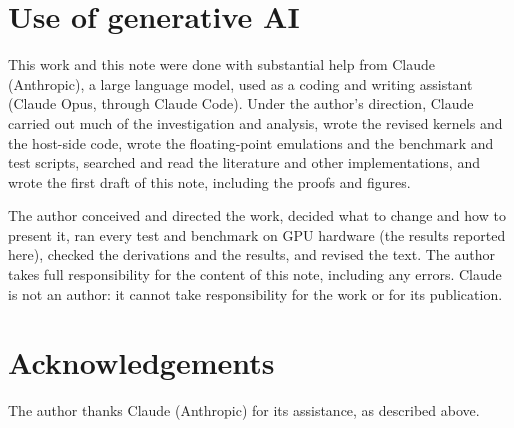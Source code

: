 \documentclass[11pt,a4paper]{article}
\theoremstyle{remark}
\begin{document}
\section*{Use of generative AI}
This work and this note were done with substantial help from Claude (Anthropic), a large language model, used
as a coding and writing assistant (Claude Opus, through Claude Code). Under the author's
direction, Claude carried out much of the investigation and analysis, wrote the revised kernels and the
host-side code, wrote the floating-point emulations and the benchmark and test scripts, searched and read the
literature and other implementations, and wrote the first draft of this note, including the proofs and
figures.

The author conceived and directed the work, decided what to change and how to present it, ran every test and
benchmark on GPU hardware (the results reported here), checked the derivations and the results, and revised
the text. The author takes full responsibility for the content of this note, including any errors. Claude is
not an author: it cannot take responsibility for the work or for its publication.

\section*{Acknowledgements}
The author thanks Claude (Anthropic) for its assistance, as described above.
\end{document}
